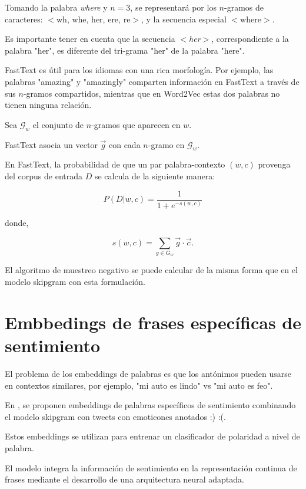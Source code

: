 Tomando la palabra \emph{where} y $n = 3$, se representará por los $n$-gramos de caracteres: $<$wh, whe, her, ere, re$>$, y la secuencia especial $<$where$>$.

Es importante tener en cuenta que la secuencia \emph{$<$her$>$}, correspondiente a la palabra "her", es diferente del tri-grama "her" de la palabra "here".

FastText es útil para los idiomas con una rica morfología. Por ejemplo, las palabras "amazing" y "amazingly" comparten información en FastText a través de sus $n$-gramos compartidos, mientras que en Word2Vec estas dos palabras no tienen ninguna relación.

Sea $\mathcal{G}_{w}$ el conjunto de $n$-gramos que aparecen en $w$.

FastText asocia un vector $\vec{g}$ con cada $n$-gramo en $\mathcal{G}_{w}$.

En FastText, la probabilidad de que un par palabra-contexto $(w, c)$ provenga del corpus de entrada $D$ se calcula de la siguiente manera:

\begin{displaymath}
P(D | w, c) = \frac{1}{1+e^{-s(w,c)}}
\end{displaymath}

donde,

\begin{displaymath}
s(w,c) = \sum_{g \in {G}_{w}} \vec{g} \cdot \vec{c}.
\end{displaymath}

El algoritmo de muestreo negativo se puede calcular de la misma forma que en el modelo skipgram con esta formulación.

\section{Embbedings de frases específicas de sentimiento}
El problema de los embeddings de palabras es que los antónimos pueden usarse en contextos similares, por ejemplo, "mi auto es lindo" vs "mi auto es feo".

En \cite{TangCol14}, se proponen embeddings de palabras específicos de sentimiento combinando el modelo skipgram con tweets con emoticones anotados :) :(.

Estos embeddings se utilizan para entrenar un clasificador de polaridad a nivel de palabra.

El modelo integra la información de sentimiento en la representación continua de frases mediante el desarrollo de una arquitectura neural adaptada.

